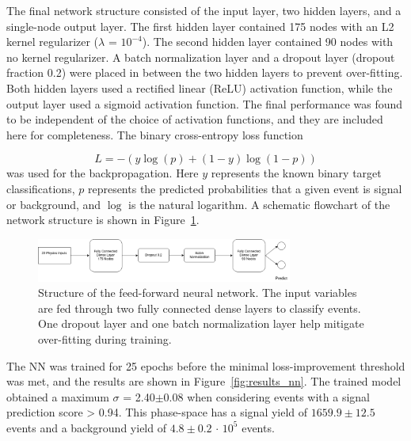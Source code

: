 The final network structure consisted of the input layer, two hidden layers, and a single-node output layer. The first hidden layer contained 175 nodes with an L2 kernel regularizer ($\lambda$ = $10^{-4}$). The second hidden layer contained 90 nodes with no kernel regularizer. A batch normalization layer and a dropout layer (dropout fraction 0.2) were placed in between the two hidden layers to prevent over-fitting. Both hidden layers used a rectified linear (ReLU) activation function, while the output layer used a sigmoid activation function. The final performance was found to be independent of the choice of activation functions, and they are included here for completeness. The binary cross-entropy loss function

\begin{equation*}
L = -(y\log(p)+(1-y)\log(1-p))
\end{equation*}
was used for the backpropagation. Here $y$ represents the known binary target classifications, $p$ represents the predicted probabilities that a given event is signal or background, and $\log$ is the natural logarithm. A schematic flowchart of the network structure is shown in Figure~\ref{fig:nn}.

\begin{figure}[!h] 
\begin{center}
\includegraphics*[width=0.75\textwidth] {ffNN/figures/flowchart_ffNN.png}
\caption{Structure of the feed-forward neural network. The input variables are fed through two fully connected dense layers to classify events. One dropout layer and one batch normalization layer help mitigate over-fitting during training.}
  \label{fig:nn}
\end{center}
\end{figure}

The NN was trained for 25 epochs before the minimal loss-improvement threshold was met, and the results are shown in Figure~\ref{fig:results_nn}. The trained model obtained a maximum $\sigma$ = 2.40$\pm$0.08 when considering events with a signal prediction score > 0.94. This phase-space has a signal yield of $1659.9 \pm 12.5$ events and a background yield of $4.8 \pm 0.2$ $\cdot$ $10^5$ events. %

